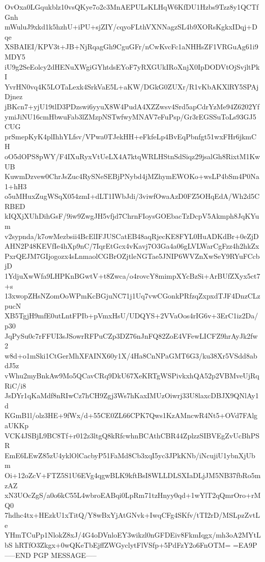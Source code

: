 OvOxa0LGqukblz10vsQKye7o2c3MnAEPULsKLHqW6KfDU1Hzbs9Tzz8y1QCTfGnh
mWuluJ9xkd1k5hzhU+iPU+sjZIY/cqyoFLthVXNNagzSL4b9XORsKgkxIDqj+Dqe
XSBAIEI/KPV3t+JB+NjRqagGh9CguGFr/nCwKvcFc1aNHHsZF1VRGuAg61i9MDY5
iU9g2SeEolcy2dHENuXWgiGYhtdsEYoF7yRXGUkIRoXnjX0IpDODVtOjSvjltPkI
YvrHN0vq4K5LOTaLexk4SrkVaE5L+aKW/DGkG0ZUXr/R1vKbAKXlRY5SPAjDjnez
jBKcn7+yjU19tlD3PDzswi6yyuX8W4PudA4XZZwsv4Srd5apCdrYzMe94Z6202Yf
ymiJiNU16cmHbwuFab3lZMzpNSTwfwyMNAV7eFuPsp/Gr3rEGSSuToLs93GJ5CUG
prSmepKyK4plIhhYLfsv/VPwa0TJekHH+eFkfeLp4BvEqPbnfgt51wxFHr6jkmCH
oO5dOPS8pWY/F4IXuRyxVtUeLX4A7ktqWRLHStnSdSiqz29jsalGh8RixtM1KwUB
KuwmDzvew0ChrJsZuc4RySNeSEBjPNybd4jMZhymEWOKo+wsLP4bSm4P0Na1+hH3
o5uMHuxZugWSqX054zmI+dLT1IWbJdi/3viwfOwaAzD0FZ5OHqEdA/Wh2d5CRBED
kIQXjXUhDihGsF/9iw9ZwgJH5vfjd7ChrnFIoysGOEbacTzDcpV5Akmph8JqKYum
v2sypnda/k7owMezbsii4BcElIFJUSCatEB48aqRjecKE8FYL0HuADKdBr+0eZjD
AHN2P48KEVfIe4hXp9nC/7IqrEtGcx4vKavj7O3Ga4a06gLVLWarCgFzz4h2hkZx
PxrQEJM7GIjogozx4sLnmaolCGBrOZjtleNGTae5JNIP6WVZnXwSeY9RYuFCcbjD
1YdjuXwWfa9LHPKnBGwtV+t8Zwca/o4rovcY8mimpXYcBzSi+ArBUfZXyx5ct7+s
13xwopZHsNZomOoWPmKcBGjuNC71j1Uq7vwCGonkPRfzqZxpxdTJF4DnzCLzpucN
XB5TgjH9mfE0utLntFPIb+pVmxHsU/UDQYS+2VVaOos4rIG6v+3ErC1iz2Da/p30
JqPySu0c7rFFUI3sJSowrRFPuCZp3DZ76nJnFQ82ZoE4VFewLICFZ9hrAyJk2fw2
w8d+o1mSki1CtGerMhXFAINX60y1X/4Ha8CnNPaGMT6G3/ku38Xr5VSdd8abdJ5z
vWhu2myBnkAw9Mo5QCavCRq9DkU67XeKRTgWSPivkxhQA52p2VBMveUjRqRiC/i8
JsDYr1qKaMdf8nRIwCz7hCH9Zgj3Ws7hKaxIMUzOiwrj33U8laxcDBJX9QNlAy1d
KGmB1l/olz3HE+9fWx/d+55CE0ZL66CPK7Qws1KzAMncwR4Nt5+OVd7FAlgaUKKp
VCK4JSBjL9BC8Tf+r012z3ltgQ8kRfcwhnBCAthCBR44ZplzzSIBVEgZvUcBhPSR
EmE6LEwZ85zU4yklOlCacbyP51FaMd8Cb3xqI5yc3JPkKNb/iNcujiU1ybnXjUbm
Oi+12oZcV+FTZ5S1U6EVg4qgwBLK9kftBsI8WLLDLSXIaDLjJM5NB37fbRo5mzAZ
xN3UOcZgS/a0o6kC55L4wbroEABqi0LpRm71tzHnyy0qd+1wYlT2qQmrOro+rMQ0
7hdhc4tx+HEzkU1xTitQ/Y8wBxYjAtGNvk+IwqCFg4SKfv/tTI2rD/MSLpzZvtLe
YHmTCuPp1NlokZ8xJ/4G4oDVnloEY3wikzl0nGFDEiv8FkmIqgx/mh3oA2MYtLbS
hRTfO3Zkgx+0wQKeTbEjffZWGyclytFlVSfp+5PdFzY2o6FnOTM=
=EA9P
-----END PGP MESSAGE-----
